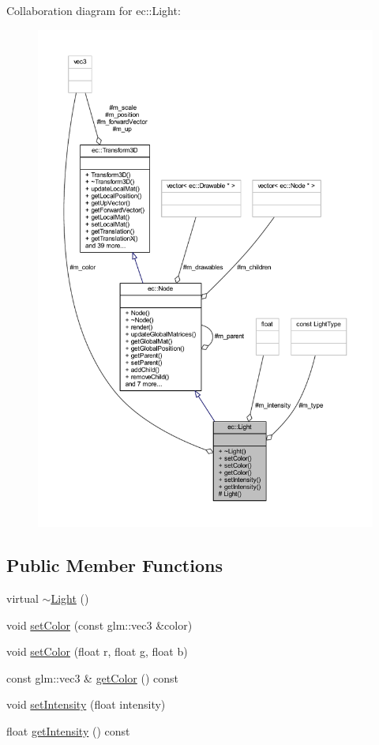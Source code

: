 Collaboration diagram for ec\+:\+:Light\+:\nopagebreak
\begin{figure}[H]
\begin{center}
\leavevmode
\includegraphics[width=350pt]{classec_1_1_light__coll__graph}
\end{center}
\end{figure}
\subsection*{Public Member Functions}
\begin{DoxyCompactItemize}
\item 
virtual \mbox{\hyperlink{classec_1_1_light_af9024a28fff2403705d1a6e9cad4a128}{$\sim$\+Light}} ()
\item 
void \mbox{\hyperlink{classec_1_1_light_ab3a3ade92e06121c965216fb168ef5db}{set\+Color}} (const glm\+::vec3 \&color)
\item 
void \mbox{\hyperlink{classec_1_1_light_aaa6d6edfe31b15dc259a8fa0d59ef8de}{set\+Color}} (float r, float g, float b)
\item 
const glm\+::vec3 \& \mbox{\hyperlink{classec_1_1_light_a3eaa8c20fc0d48588078bd82f13fbaef}{get\+Color}} () const
\item 
void \mbox{\hyperlink{classec_1_1_light_ae2b2bbbc88aef9d531627bb90f7b0183}{set\+Intensity}} (float intensity)
\item 
float \mbox{\hyperlink{classec_1_1_light_a8380a3371b458030258bcf7a39857e17}{get\+Intensity}} () const
\end{DoxyCompactItemize}
